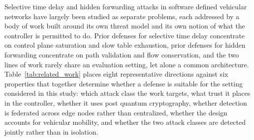 \documentclass[lettersize,journal]{IEEEtran}
\theoremstyle{plain}
\theoremstyle{remark}
\begin{document}
	Selective time delay and hidden forwarding attacks in software defined
	vehicular networks have largely been studied as separate problems, each
	addressed by a body of work built around its own threat model and its own
	notion of what the controller is permitted to do. Prior defenses for
	selective time delay concentrate on control plane saturation and slow
	table exhaustion, prior defenses for hidden forwarding concentrate on path
	validation and flow conservation, and the two lines of work rarely share
	an evaluation setting, let alone a common architecture. Table~\ref{tab:related_work}
	places eight representative directions against six properties that
	together determine whether a defense is suitable for the setting
	considered in this study: which attack class the work targets, what trust
	it places in the controller, whether it uses post quantum cryptography,
	whether detection is federated across edge nodes rather than centralized,
	whether the design accounts for vehicular mobility, and whether the two
	attack classes are detected jointly rather than in isolation.
	
\end{document}
